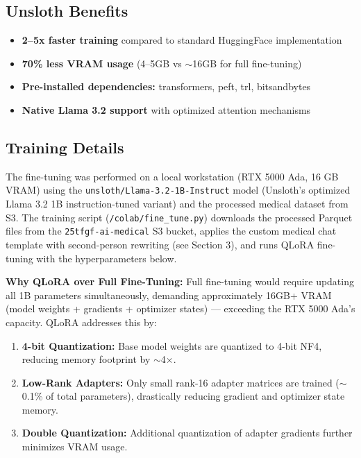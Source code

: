 \documentclass[11pt,a4paper]{article}
\begin{document}
\subsection{Unsloth Benefits}

\begin{itemize}[nosep]
    \item \textbf{2--5x faster training} compared to standard HuggingFace implementation
    \item \textbf{70\% less VRAM usage} (4--5GB vs $\sim$16GB for full fine-tuning)
    \item \textbf{Pre-installed dependencies:} transformers, peft, trl, bitsandbytes
    \item \textbf{Native Llama 3.2 support} with optimized attention mechanisms
\end{itemize}

\subsection{Training Details}

The fine-tuning was performed on a local workstation (RTX 5000 Ada, 16 GB VRAM) using the \texttt{unsloth/Llama-3.2-1B-Instruct} model (Unsloth's optimized Llama 3.2 1B instruction-tuned variant) and the processed medical dataset from S3. The training script (\texttt{/colab/fine\_tune.py}) downloads the processed Parquet files from the \texttt{25tfgf-ai-medical} S3 bucket, applies the custom medical chat template with second-person rewriting (see Section 3), and runs QLoRA fine-tuning with the hyperparameters below.

\textbf{Why QLoRA over Full Fine-Tuning:} Full fine-tuning would require updating all 1B parameters simultaneously, demanding approximately 16GB+ VRAM (model weights + gradients + optimizer states) --- exceeding the RTX 5000 Ada's capacity. QLoRA addresses this by:
\begin{enumerate}
    \item \textbf{4-bit Quantization:} Base model weights are quantized to 4-bit NF4, reducing memory footprint by $\sim$4$\times$.
    \item \textbf{Low-Rank Adapters:} Only small rank-16 adapter matrices are trained ($\sim$0.1\% of total parameters), drastically reducing gradient and optimizer state memory.
    \item \textbf{Double Quantization:} Additional quantization of adapter gradients further minimizes VRAM usage.
\end{enumerate}
\end{document}
